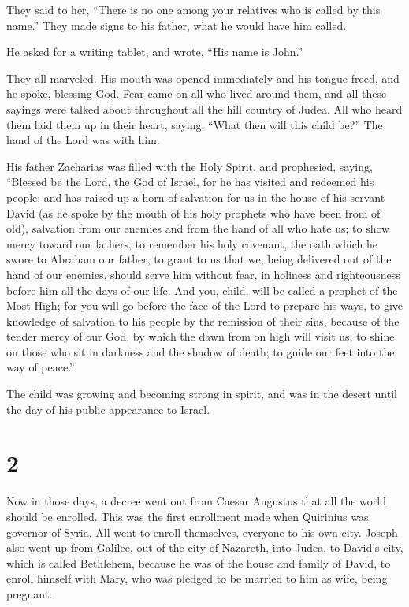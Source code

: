  They said to her, ``There is no one among your relatives
who is called by this name.''  They made signs to his
father, what he would have him called.

 He asked for a writing tablet, and wrote, ``His name is
John.''

They all marveled.  His mouth was opened immediately and
his tongue freed, and he spoke, blessing God.  Fear came
on all who lived around them, and all these sayings were talked about
throughout all the hill country of Judea.  All who heard
them laid them up in their heart, saying, ``What then will this child
be?'' The hand of the Lord was with him.

 His father Zacharias was filled with the Holy Spirit,
and prophesied, saying,  ``Blessed be the Lord, the God
of Israel, for he has visited and redeemed his people; 
and has raised up a horn of salvation for us in the house of his servant
David  (as he spoke by the mouth of his holy prophets who
have been from of old),  salvation from our enemies and
from the hand of all who hate us;  to show mercy toward
our fathers, to remember his holy covenant,  the oath
which he swore to Abraham our father,  to grant to us
that we, being delivered out of the hand of our enemies, should serve
him without fear,  in holiness and righteousness before
him all the days of our life.  And you, child, will be
called a prophet of the Most High; for you will go before the face of
the Lord to prepare his ways,  to give knowledge of
salvation to his people by the remission of their sins, 
because of the tender mercy of our God, by which the dawn from on high
will visit us,  to shine on those who sit in darkness and
the shadow of death; to guide our feet into the way of peace.''

 The child was growing and becoming strong in spirit, and
was in the desert until the day of his public appearance to Israel.

\hypertarget{section-1}{%
\section{2}\label{section-1}}

 Now in those days, a decree went out from Caesar Augustus
that all the world should be enrolled.  This was the first
enrollment made when Quirinius was governor of Syria.  All
went to enroll themselves, everyone to his own city. 
Joseph also went up from Galilee, out of the city of Nazareth, into
Judea, to David's city, which is called Bethlehem, because he was of the
house and family of David,  to enroll himself with Mary,
who was pledged to be married to him as wife, being pregnant.


